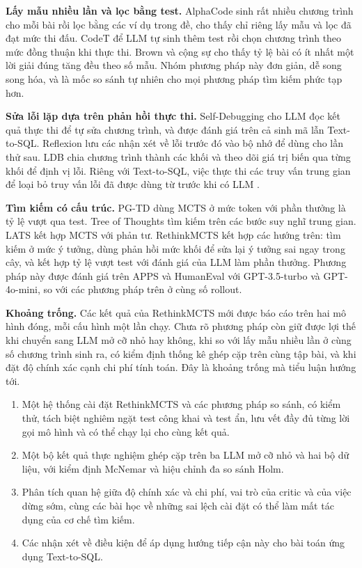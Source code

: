 
\textbf{Lấy mẫu nhiều lần và lọc bằng test.} AlphaCode \cite{li2022alphacode} sinh rất nhiều chương trình cho mỗi bài rồi lọc bằng các ví dụ trong đề, cho thấy chỉ riêng lấy mẫu và lọc đã đạt mức thi đấu. CodeT \cite{chen2022codet} để LLM tự sinh thêm test rồi chọn chương trình theo mức đồng thuận khi thực thi. Brown và cộng sự \cite{brown2024monkeys} cho thấy tỷ lệ bài có ít nhất một lời giải đúng tăng đều theo số mẫu. Nhóm phương pháp này đơn giản, dễ song song hóa, và là mốc so sánh tự nhiên cho mọi phương pháp tìm kiếm phức tạp hơn.

\textbf{Sửa lỗi lặp dựa trên phản hồi thực thi.} Self-Debugging \cite{chen2023selfdebug} cho LLM đọc kết quả thực thi để tự sửa chương trình, và được đánh giá trên cả sinh mã lẫn Text-to-SQL. Reflexion \cite{shinn2023reflexion} lưu các nhận xét về lỗi trước đó vào bộ nhớ để dùng cho lần thử sau. LDB \cite{zhong2024ldb} chia chương trình thành các khối và theo dõi giá trị biến qua từng khối để định vị lỗi. Riêng với Text-to-SQL, việc thực thi các truy vấn trung gian để loại bỏ truy vấn lỗi đã được dùng từ trước khi có LLM \cite{wang2018egd}.

\textbf{Tìm kiếm có cấu trúc.} PG-TD \cite{zhang2023pgtd} dùng MCTS ở mức token với phần thưởng là tỷ lệ vượt qua test. Tree of Thoughts \cite{yao2023tot} tìm kiếm trên các bước suy nghĩ trung gian. LATS \cite{zhou2023lats} kết hợp MCTS với phản tư. RethinkMCTS \cite{li2024rethinkmcts} kết hợp các hướng trên: tìm kiếm ở mức ý tưởng, dùng phản hồi mức khối để sửa lại ý tưởng sai ngay trong cây, và kết hợp tỷ lệ vượt test với đánh giá của LLM làm phần thưởng. Phương pháp này được đánh giá trên APPS và HumanEval với GPT-3.5-turbo và GPT-4o-mini, so với các phương pháp trên ở cùng số rollout.

\textbf{Khoảng trống.} Các kết quả của RethinkMCTS mới được báo cáo trên hai mô hình đóng, mỗi cấu hình một lần chạy. Chưa rõ phương pháp còn giữ được lợi thế khi chuyển sang LLM mở cỡ nhỏ hay không, khi so với lấy mẫu nhiều lần ở cùng số chương trình sinh ra, có kiểm định thống kê ghép cặp trên cùng tập bài, và khi đặt độ chính xác cạnh chi phí tính toán. Đây là khoảng trống mà tiểu luận hướng tới.


\begin{enumerate}
  \item Một hệ thống cài đặt RethinkMCTS và các phương pháp so sánh, có kiểm thử, tách biệt nghiêm ngặt test công khai và test ẩn, lưu vết đầy đủ từng lời gọi mô hình và có thể chạy lại cho cùng kết quả.
  \item Một bộ kết quả thực nghiệm ghép cặp trên ba LLM mở cỡ nhỏ và hai bộ dữ liệu, với kiểm định McNemar và hiệu chỉnh đa so sánh Holm.
  \item Phân tích quan hệ giữa độ chính xác và chi phí, vai trò của critic và của việc dừng sớm, cùng các bài học về những sai lệch cài đặt có thể làm mất tác dụng của cơ chế tìm kiếm.
  \item Các nhận xét về điều kiện để áp dụng hướng tiếp cận này cho bài toán ứng dụng Text-to-SQL.
\end{enumerate}

